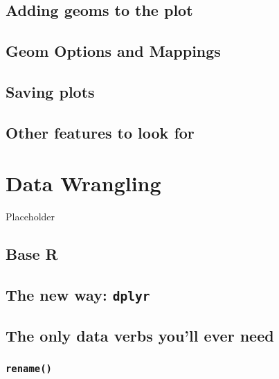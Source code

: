 \documentclass[
]{book}
\begin{document}
\hypertarget{adding-geoms-to-the-plot}{%
\section{Adding geoms to the plot}\label{adding-geoms-to-the-plot}}

\hypertarget{geom-options-and-mappings}{%
\section{Geom Options and Mappings}\label{geom-options-and-mappings}}

\hypertarget{saving-plots}{%
\section{Saving plots}\label{saving-plots}}

\hypertarget{other-features-to-look-for}{%
\section{Other features to look for}\label{other-features-to-look-for}}

\hypertarget{data-wrangling}{%
\chapter{Data Wrangling}\label{data-wrangling}}

Placeholder

\hypertarget{base-r}{%
\section{Base R}\label{base-r}}

\hypertarget{the-new-way-dplyr}{%
\section{\texorpdfstring{The new way: \texttt{dplyr}}{The new way: dplyr}}\label{the-new-way-dplyr}}

\hypertarget{the-only-data-verbs-youll-ever-need}{%
\section{The only data verbs you'll ever need}\label{the-only-data-verbs-youll-ever-need}}

\hypertarget{rename}{%
\subsection{\texorpdfstring{\texttt{rename()}}{rename()}}\label{rename}}
\end{document}
